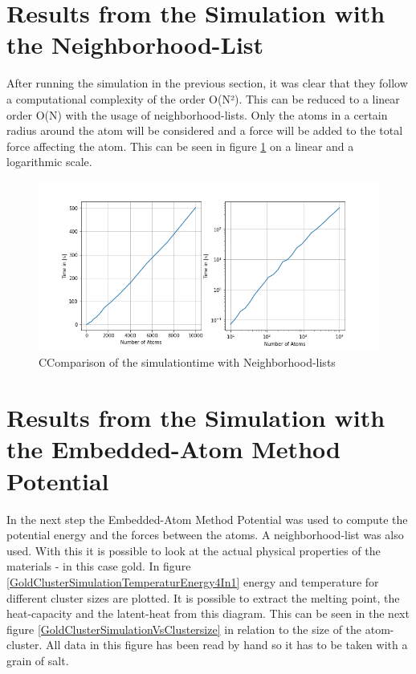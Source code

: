 \section{Results from the Simulation with the Neighborhood-List}

After running the simulation in the previous section, it was clear that they follow a computational complexity of the order O(N²). This can be reduced to a linear order O(N) with the usage of neighborhood-lists. Only the atoms in a certain radius around the atom will be considered and a force will be added to the total force affecting the atom. This can be seen in figure \ref{PlotSimulationTimesCutoffNew} on a linear and a logarithmic scale.  
\begin{figure}
	\begin{center}
		\includegraphics[scale=1.25]{Figure/plotAtomTimesMoreData.png}
	\end{center}
	\caption[Comparison of the simulationtime with Neighborhood-lists ]{CComparison of the simulationtime with Neighborhood-lists}
	\label{PlotSimulationTimesCutoffNew}
\end{figure}

\section{Results from the Simulation with the Embedded-Atom Method Potential}

In the next step the Embedded-Atom Method Potential was used to compute the potential energy and the forces between the atoms. A neighborhood-list was also used. With this it is possible to look at the actual physical properties of the materials - in this case gold. In figure \ref{GoldClusterSimulationTemperaturEnergy4In1} energy and temperature for different cluster sizes are plotted. It is possible to extract the melting point, the heat-capacity and the latent-heat from this diagram. This can be seen in the next figure \ref{GoldClusterSimulationVsClustersize} in relation to the size of the atom-cluster. All data in this figure has been read by hand so it has to be taken with a grain of salt. 

